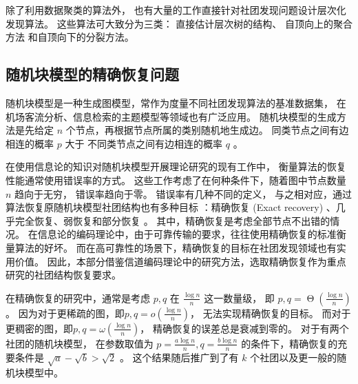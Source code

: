 除了利用数据聚类的算法外，
也有大量的工作直接针对社团发现问题设计层次化发现算法。
这些算法可大致分为三类\cite{li2022hierarchical}：
直接估计层次树的结构\cite{arenas2006synchronization, blundell2013bhcd}、
自顶向上的聚合方法\cite{clauset2004finding}
和自顶向下的分裂方法\cite{girvan2002community, dasgupta2016cost}。

\subsection{随机块模型的精确恢复问题}
随机块模型是一种生成图模型，常作为度量不同社团发现算法的基准数据集，
在机场客流分析\cite{zhao2016rfla}、信息检索的主题模型\cite{Gerlach_2018}等领域也有广泛应用。
随机块模型的生成方法是先给定 $n$ 个节点，再根据节点所属的类别随机地生成边。
同类节点之间有边相连的概率  $p$ 大于
不同类节点之间有边相连的概率 $q$ \cite{abbe2017community}。

在使用信息论的知识对随机块模型开展理论研究的现有工作中，
衡量算法的恢复性能通常使用错误率的方式。
这些工作考虑了在何种条件下，随着图中节点数量 $n$ 趋向于无穷，
错误率趋向于零。
错误率有几种不同的定义，
与之相对应，通过算法恢复原随机块模型社团结构也有多种目标
：精确恢复 (Exact recovery) 、几乎完全恢复、弱恢复和部分恢复
\cite{abbe2017community}。
其中，精确恢复是考虑全部节点不出错的情况。
在信息论的编码理论中，由于可靠传输的要求，往往使用精确恢复的标准衡量算法的好坏。
而在高可靠性的场景下，精确恢复的目标在社团发现领域也有实用价值。
因此，本部分借鉴信道编码理论中的研究方法，选取精确恢复作为重点研究的社团结构恢复要求。


在精确恢复的研究中，通常是考虑 $p, q$ 在 $\frac{\log n}{n}$ 这一数量级，
即 $p,q=\upTheta \left(\frac{\log n}{n} \right)$。
因为对于更稀疏的图，即$p, q=o\left(\frac{\log n}{n} \right)$，
无法实现精确恢复的目标。
而对于更稠密的图，即$p,q=\omega\left(\frac{\log n}{n} \right)$，
精确恢复的误差总是衰减到零的。
对于有两个社团的随机块模型，
在参数取值为 $p=\frac{a \log n}{n}, q = \frac{b \log n }{n}$
的条件下，精确恢复的充要条件是
$\sqrt{a} - \sqrt{b} > \sqrt{2}$ \cite{abbe2015exact, mossel2016}。
这个结果随后推广到了有 $k$ 个社团以及更一般的随机块模型中\cite{abbe2015community}。

